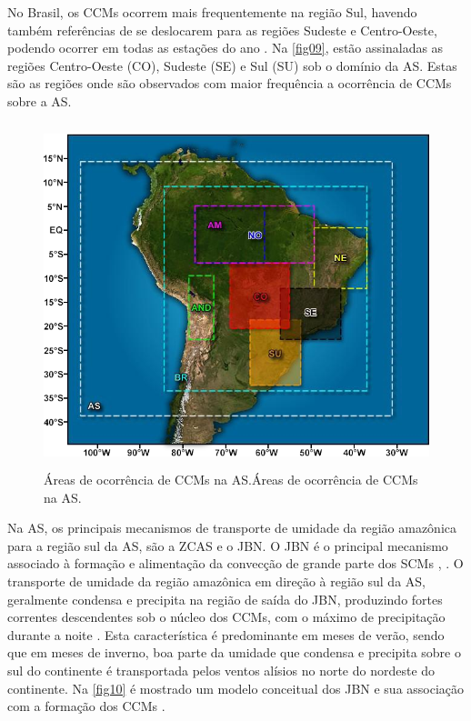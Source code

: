 No Brasil, os CCMs ocorrem mais frequentemente na região Sul, havendo também referências de se deslocarem para as regiões Sudeste e Centro-Oeste, podendo ocorrer em todas as estações do ano \cite{silvadias96}. Na \autoref{fig09}, estão assinaladas as regiões Centro-Oeste (CO), Sudeste (SE) e Sul (SU) sob o domínio da AS. Estas são as regiões onde são observados com maior frequência a ocorrência de CCMs sobre a AS.

\begin{figure}[!hbp]
\centering
\includegraphics[height=10cm]{./figs/fig09.png}
\caption{Áreas de ocorrência de CCMs na AS.Áreas de ocorrência de CCMs na AS.}
\label{fig09}
\end{figure}

Na AS, os principais mecanismos de transporte de umidade da região amazônica para a região sul da AS, são a ZCAS e o JBN. O JBN é o principal mecanismo associado à formação e alimentação da convecção de grande parte dos SCMs \cite{ferreiraetal03}, \cite{herdiesetal02}. O transporte de umidade da região amazônica em direção à região sul da AS, geralmente condensa e precipita na região de saída do JBN, produzindo fortes correntes descendentes sob o núcleo dos CCMs, com o máximo de precipitação durante a noite \cite{noguespaegleberbery00}. Esta característica é predominante em meses de verão, sendo que em meses de inverno, boa parte da umidade que condensa e precipita sobre o sul do continente é transportada pelos ventos alísios no norte do nordeste do continente. Na \autoref{fig10} é mostrado um modelo conceitual dos JBN e sua associação com a formação dos CCMs \cite{marengoetal04}.

